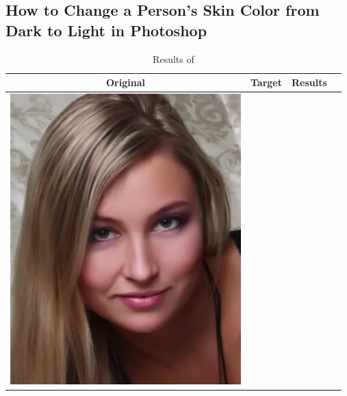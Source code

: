 \documentclass[12pt, a4paper]{article}
\begin{document}
\subsection{How to Change a Person's Skin Color from Dark to Light in Photoshop}
\begin{longtable}{|c||c|c|c|}
    \caption{Results of }\\
    \hline
    Original & Target & Results \\
    \hline
  \begin{minipage}{.29\textwidth}
    \includegraphics[width=\textwidth,height=\textheight,keepaspectratio]{images/match_body_orig}
  \end{minipage} & 
  \begin{minipage}{.29\textwidth}

\end{minipage}
\end{longtable}
\end{document}
